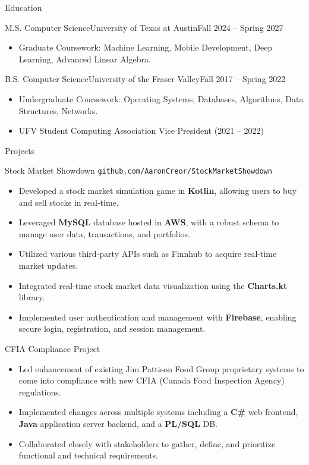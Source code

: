 \documentclass[]{mcdowellcv}
\begin{document}
	\begin{cvsection}{Education}
		\begin{cvsubsection}{M.S. Computer Science}{University of Texas at Austin}{Fall 2024 -- Spring 2027}
			\begin{itemize}
				\item Graduate Coursework: Machine Learning, Mobile Development, Deep Learning, Advanced Linear Algebra.
			\end{itemize}
		\end{cvsubsection}
		\begin{cvsubsection}{B.S. Computer Science}{University of the Fraser Valley}{Fall 2017 -- Spring 2022}
			\begin{itemize}
				\item Undergraduate Coursework: Operating Systems, Databases, Algorithms, Data Structures, Networks.
				\item UFV Student Computing Association Vice President (2021 – 2022)
			\end{itemize}
		\end{cvsubsection}
	\end{cvsection}
	
	\begin{cvsection}{Projects}
		\begin{cvsubsection}{Stock Market Showdown}{}{}
		\texttt{github.com/AaronCreor/StockMarketShowdown}
			\begin{itemize}
				\item Developed a stock market simulation game in \textbf{Kotlin}, allowing users to buy and sell stocks in real-time.
				\item Leveraged \textbf{MySQL} database hosted in \textbf{AWS}, with a robust schema to manage user data, transactions, and portfolios.
				\item Utilized various third-party APIs such as Finnhub to acquire real-time market updates.
				\item Integrated real-time stock market data visualization using the \textbf{Charts.kt} library.
				\item Implemented user authentication and management with \textbf{Firebase}, enabling secure login, registration, and session management.
			\end{itemize}
		\end{cvsubsection}
		\begin{cvsubsection}{CFIA Compliance Project}{}{}
			\begin{itemize}
				\item Led enhancement of existing Jim Pattison Food Group proprietary systems to come into compliance with new CFIA (Canada Food Inspection Agency) regulations.
				\item Implemented changes across multiple systems including a \textbf{C\#} web frontend, \textbf{Java} application server backend, and a \textbf{PL/SQL} DB.
				\item Collaborated closely with stakeholders to gather, define, and prioritize functional and technical requirements.
			\end{itemize}
		\end{cvsubsection}
	\end{cvsection}
	
\end{document}
